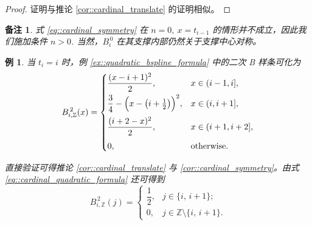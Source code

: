 \documentclass[a4paper]{ctexart}
\newtheorem{remark}{备注}
\newtheorem{example}[theorem]{例}
\numberwithin{theorem}{section}
\numberwithin{equation}{section}
\numberwithin{figure}{section}
\numberwithin{remark}{section}
\begin{document}
\begin{proof}
证明与推论 \ref{cor::cardinal_translate} 的证明相似。 
\end{proof}

\begin{remark}
    \label{rem::n0_exception}
式 \eqref{eq::cardinal_symmetry} 在 $n=0,\ x=t_{i-1}$ 的情形并不成立，因此我们施加条件 $n>0$. 当然，$B^{\,0}_i$ 在其支撑内部仍然关于支撑中心对称。
\end{remark}

\begin{example}
    \label{ex::cardinal_quadratic}
当 $t_i=i$ 时，例 \ref{ex::quadratic_bspline_formula} 中的二次 B 样条可化为
\begin{equation}
\label{eq::cardinal_quadratic_formula}
B^{\,2}_{i,\mathbb{Z}}(x)=
\begin{cases}
\dfrac{(x-i+1)^2}{2}, & x\in(i-1,i],\\[6pt]
\dfrac{3}{4}-\Bigl(x-\bigl(i+\tfrac{1}{2}\bigr)\Bigr)^2, & x\in(i,i+1],\\[8pt]
\dfrac{(i+2-x)^2}{2}, & x\in(i+1,i+2],\\[8pt]
0, & \text{otherwise}.
\end{cases}
\end{equation}

直接验证可得推论 \ref{cor::cardinal_translate} 与 \ref{cor::cardinal_symmetry}。由式 \eqref{eq::cardinal_quadratic_formula} 还可得到
\begin{equation}
\label{eq::cardinal_quadratic_values}
B^{\,2}_{i,\mathbb{Z}}(j)=
\begin{cases}
\dfrac{1}{2}, & j\in\{i,\,i+1\};\\[6pt]
0, & j\in\mathbb{Z}\setminus\{i,\,i+1\}.
\end{cases}
\end{equation}
\end{example}
\end{document}
